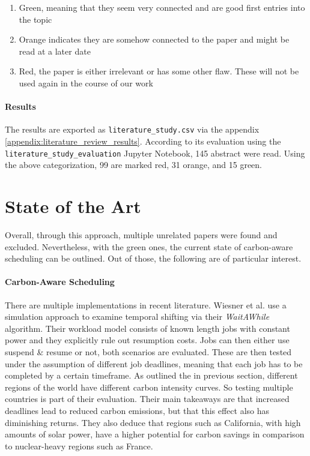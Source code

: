 \begin{enumerate}
    \item Green, meaning that they seem very connected and are good first entries into the topic
    \item Orange indicates they are somehow connected to the paper and might be read at a later date
    \item Red, the paper is either irrelevant or has some other flaw. These will not be used again in the course of our work
\end{enumerate}

\newpage
\paragraph{Results}

The results are exported as \verb|literature_study.csv| via the appendix \ref{appendix:literature_review_results}. 
According to its evaluation using the \verb|literature_study_evaluation| Jupyter Notebook, 145 abstract were read. 
Using the above categorization, 99 are marked red, 31 orange, and 15 green.

\section{State of the Art} \label{sec:state_of_the_art}

Overall, through this approach, multiple unrelated papers were found and excluded.
Nevertheless, with the green ones, the current state of carbon-aware scheduling can be outlined.
Out of those, the following are of particular interest.

\paragraph{Carbon-Aware Scheduling}
There are multiple implementations in recent literature. Wiesner et al. \cite{wiesner_lets_2021} use a simulation approach to examine temporal shifting via their \emph{WaitAWhile} algorithm. 
Their workload model consists of known length jobs with constant power and they explicitly rule out resumption costs. 
Jobs can then either use suspend \& resume or not, both scenarios are evaluated. 
These are then tested under the assumption of different job deadlines, meaning that each job has to be completed by a certain timeframe. 
As outlined the in previous section, different regions of the world have different carbon intensity curves. 
So testing multiple countries is part of their evaluation.
Their main takeaways are that increased deadlines lead to reduced carbon emissions, but that this effect also has diminishing returns. 
They also deduce that regions such as California, with high amounts of solar power, have a higher potential for carbon savings in comparison to nuclear-heavy regions such as France.

